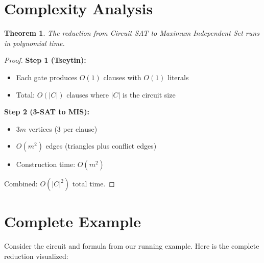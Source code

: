 \documentclass[11pt,a4paper]{article}
\newtheorem{theorem}{Theorem}
\begin{document}
\section{Complexity Analysis}

\begin{theorem}
The reduction from Circuit SAT to Maximum Independent Set runs in polynomial time.
\end{theorem}

\begin{proof}
\textbf{Step 1 (Tseytin):}
\begin{itemize}
    \item Each gate produces $O(1)$ clauses with $O(1)$ literals
    \item Total: $O(|C|)$ clauses where $|C|$ is the circuit size
\end{itemize}

\textbf{Step 2 (3-SAT to MIS):}
\begin{itemize}
    \item $3m$ vertices (3 per clause)
    \item $O(m^2)$ edges (triangles plus conflict edges)
    \item Construction time: $O(m^2)$
\end{itemize}

Combined: $O(|C|^2)$ total time.
\end{proof}

\section{Complete Example}

Consider the circuit and formula from our running example. Here is the complete reduction visualized:

\begin{figure}[h]
\centering
{}
\end{figure}
\end{document}
